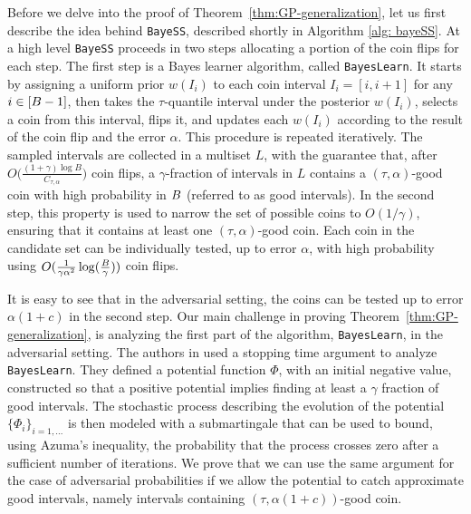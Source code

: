  Before we delve into the proof of Theorem~\ref{thm:GP-generalization}, let us first describe the idea behind \texttt{BayeSS}, described shortly in Algorithm \ref{alg: bayeSS}.
 At a high level \texttt{BayeSS} proceeds in two steps allocating a portion of the coin flips for each step. The first step is a Bayes learner algorithm, called  \texttt{BayesLearn}.
 It starts by assigning a uniform prior $w(I_i)$ to each coin interval $I_i=[i, i+1]$ for any $i \in [B-1]$, then takes the $\tau$-quantile interval under the posterior $w(I_i)$, selects a coin from this interval, flips it, and updates each $w(I_i)$ according to the result of the coin flip and the error $\alpha$. This procedure is repeated iteratively.
 The sampled intervals are collected in a multiset $L$, with the guarantee that, after \( O\big(\tfrac{(1+\gamma)\log B}{C_{\tau, \alpha}}\big) \) coin flips, a $\gamma$-fraction of intervals in  $L$  contains a $(\tau, \alpha)$-good coin with high probability in  $B$  (referred to as good intervals). In the second step, this property is used to narrow the set of possible coins to $O(1/\gamma)$, ensuring that it contains at least one $(\tau, \alpha)$-good coin. Each coin in the candidate set can be individually tested, up to error $\alpha$, with high probability using $O(\tfrac{1}{\gamma\alpha^2}\log(\tfrac{B}{\gamma}))$ coin flips.

It is easy to see that in the adversarial setting, the coins can be tested up to error $\alpha(1+c)$ in the second step. 
%
Our main challenge in proving Theorem~\ref{thm:GP-generalization}, is analyzing the first part of the algorithm, \texttt{BayesLearn}, in the adversarial setting. 
%
%
%
%
%
The authors in \cite{gretta2023sharp} used a stopping time argument to analyze \texttt{BayesLearn}. They defined a potential function $\Phi$, with an initial negative value, constructed so that a positive potential implies finding at least a $\gamma$ fraction of good intervals. The stochastic process describing the evolution of the potential $\{\Phi_{i}\}_{i=1,\dots}$ is then modeled with a submartingale that can be used to bound, using Azuma's inequality, the probability that the process crosses zero after a sufficient number of iterations. We prove that we can use the same argument for the case of adversarial probabilities if we allow the potential to catch approximate good intervals, namely intervals containing $(\tau, \alpha(1+c))$-good coin.

